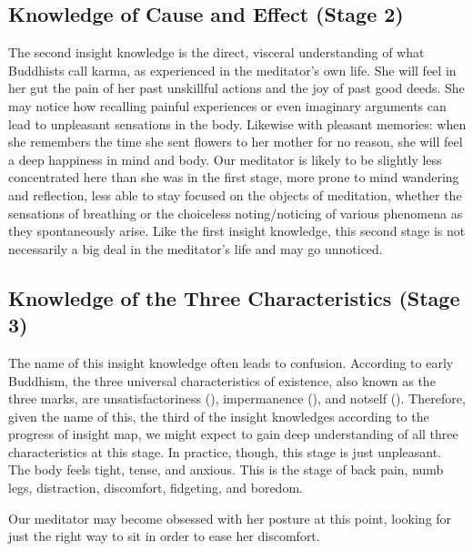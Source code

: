 \documentclass[a5paper,10pt,english]{book}
\begin{document}
\subsection{Knowledge of Cause and Effect (Stage 2)}
\label{\detokenize{main-2:knowledge-of-cause-and-effect-stage-2}}
\sphinxAtStartPar
The second insight knowledge is the direct, visceral understanding of
what Buddhists call karma, as experienced in the meditator’s own life.
She will feel in her gut the pain of her past unskillful actions and the
joy of past good deeds. She may notice how recalling painful experiences
or even imaginary arguments can lead to unpleasant sensations in the
body. Likewise with pleasant memories: when she remembers the time she
sent flowers to her mother for no reason, she will feel a deep happiness
in mind and body. Our meditator is likely to be slightly less
concentrated here than she was in the first stage, more prone to mind
wandering and reflection, less able to stay focused on the objects of
meditation, whether the sensations of breathing or the choiceless
noting/noticing of various phenomena as they spontaneously arise. Like
the first insight knowledge, this second stage is not necessarily a big
deal in the meditator’s life and may go unnoticed.


\subsection{Knowledge of the Three Characteristics (Stage 3)}
\label{\detokenize{main-2:knowledge-of-the-three-characteristics-stage-3}}
\sphinxAtStartPar
The name of this insight knowledge often leads to confusion. According
to early Buddhism, the three universal characteristics of existence,
also known as the three marks, are unsatisfactoriness (),
impermanence (), and not\sphinxhyphen{}self (). Therefore, given the
name of this, the third of the insight knowledges according to the
progress of insight map, we might expect to gain deep understanding of
all three characteristics at this stage. In practice, though, this stage
is just unpleasant. The body feels tight, tense, and anxious. This is
the stage of back pain, numb legs, distraction, discomfort, fidgeting,
and boredom.

\sphinxAtStartPar
Our meditator may become obsessed with her posture at this point,
looking for just the right way to sit in order to ease her discomfort.
\end{document}
